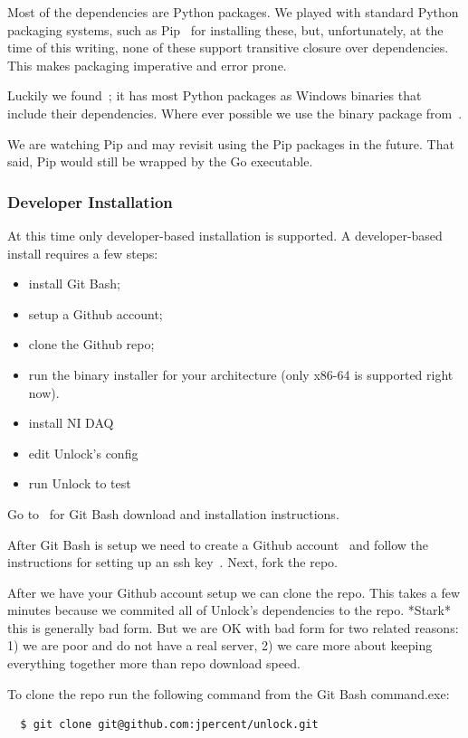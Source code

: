\documentclass[11pt]{article}
\begin{document}
Most of the dependencies are Python packages.  We played with standard Python packaging systems, such as Pip~\cite{pip} for installing these, but, unfortunately, at the time of this writing, none of these support transitive closure over dependencies.  This makes packaging imperative and error prone.  

Luckily we found~\cite{winpythonpackages}; it has most Python packages as Windows binaries that include their dependencies.  Where ever possible we use the binary package from~\cite{winpythonpackages}.  

We are watching Pip and may revisit using the Pip packages in the future.  That said, Pip would still be wrapped by the Go executable.

\subsubsection{Developer Installation}

At this time only developer-based installation is supported.  A developer-based install requires a few steps:
\begin{itemize}
\item install Git Bash;
\item setup a Github account;
\item clone the Github repo;
\item run the binary installer for your architecture (only x86-64 is supported right now).
\item install NI DAQ
\item edit Unlock's config
\item run Unlock to test
\end{itemize}

Go to~\cite{gitbash} for Git Bash download and installation instructions.  

After Git Bash is setup we need to create a Github account~\cite{github} and follow the instructions for setting up an ssh key~\cite{sshkey}.  Next, fork the repo.

After we have your Github account setup we can clone the repo.  This takes a few minutes because we commited all of Unlock's dependencies to the repo.  *Stark* this is generally bad form.  But we are OK with bad form for two related reasons: 1) we are poor and do not have a real server, 2) we care more about keeping everything together more than repo download speed.

To clone the repo run the following command from the Git Bash command.exe:
\begin{verbatim}  
  $ git clone git@github.com:jpercent/unlock.git
\end{verbatim}
\end{document}
